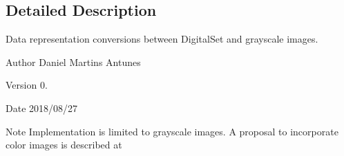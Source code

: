 \subsection{Detailed Description}
Data representation conversions between Digital\+Set and grayscale images. 

\begin{DoxyAuthor}{Author}
Daniel Martins Antunes 
\end{DoxyAuthor}
\begin{DoxyVersion}{Version}
0. 
\end{DoxyVersion}
\begin{DoxyDate}{Date}
2018/08/27 
\end{DoxyDate}
\begin{DoxyNote}{Note}
Implementation is limited to grayscale images. A proposal to incorporate color images is described at 
\end{DoxyNote}
